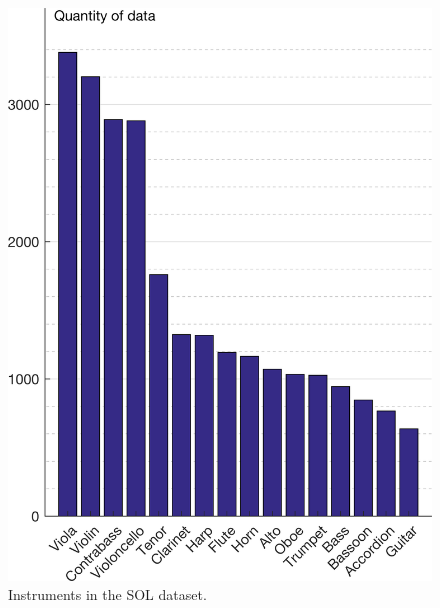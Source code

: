 \documentclass{article}
\begin{document}
\begin{figure}[t!]
\centering
\includegraphics[width=\linewidth]{./figs/histogram/histogram_instruments.png}
\caption{Instruments in the SOL dataset.}
\label{fig:instrument-dendrogram}
\end{figure}
\end{document}
